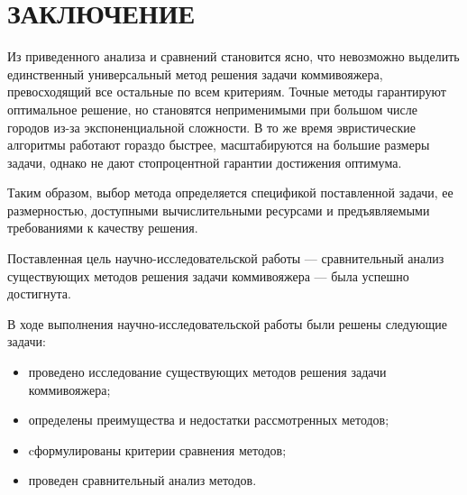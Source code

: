 \chapter*{ЗАКЛЮЧЕНИЕ}
Из приведенного анализа и сравнений становится ясно, что невозможно выделить единственный универсальный метод решения задачи коммивояжера, превосходящий все остальные по всем критериям. Точные методы гарантируют оптимальное решение, но становятся неприменимыми при большом числе городов из-за экспоненциальной сложности. В то же время эвристические алгоритмы работают гораздо быстрее, масштабируются на большие размеры задачи, однако не дают стопроцентной гарантии достижения оптимума.

Таким образом, выбор метода определяется спецификой поставленной задачи, ее размерностью, доступными вычислительными ресурсами и предъявляемыми требованиями к качеству решения.



Поставленная цель научно-исследовательской работы --- сравнительный анализ существующих методов решения задачи коммивояжера --- была успешно достигнута.

В ходе выполнения научно-исследовательской работы были решены следующие задачи:
\begin{itemize}[label=---]
    \item проведено исследование существующих методов решения задачи коммивояжера;
    \item определены преимущества и недостатки рассмотренных методов;
    \item cформулированы критерии сравнения методов;
    \item проведен сравнительный анализ методов.
\end{itemize}